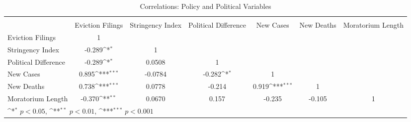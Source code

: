 \documentclass[12pt]{amsart}
\begin{document}
{\begin{table}
\caption{Correlations: Policy and Political Variables}
\label{tab:2}
\begin{adjustbox}{max width=\textwidth}
\def\sym#1{\ifmmode^{#1}\else\(^{#1}\)\fi}
\begin{tabular}{l*{6}{c}}
\hline\hline                                                                                          \\
          &Eviction Filings         & Stringency Index         &Political Difference         &New Cases         &New Deaths         &   Moratorium Length         \\
\hline
Eviction Filings&        1         &                  &                  &                  &                  &                  \\
Stringency Index&   -0.289\sym{*}  &        1         &                  &                  &                  &                  \\
Political Difference&   -0.289\sym{*}  &   0.0508         &        1         &                  &                  &                  \\
New Cases &    0.895\sym{***}&  -0.0784         &   -0.282\sym{*}  &        1         &                  &                  \\
New Deaths&    0.738\sym{***}&   0.0778         &   -0.214         &    0.919\sym{***}&        1         &                  \\
Moratorium Length    &   -0.370\sym{**} &   0.0670         &    0.157         &   -0.235         &   -0.105         &        1         \\
\hline\hline
\multicolumn{7}{l}{\footnotesize \sym{*} \(p<0.05\), \sym{**} \(p<0.01\), \sym{***} \(p<0.001\)}\\
\end{tabular}
\end{adjustbox}
\end{table}
}
\end{document}
